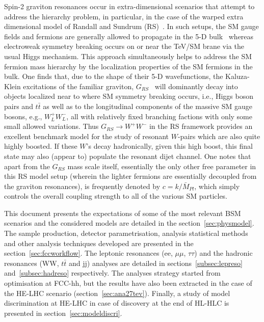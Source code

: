 \documentclass[a4paper,11pt]{article}
\begin{document}
Spin-2 graviton resonances occur in extra-dimensional scenarios that attempt to address the hierarchy problem, in particular, in the case of the warped extra dimensional model of
Randall and Sundrum (RS)~\cite{Randall:1999ee}. In such setups, the SM gauge fields and fermions are generally allowed to propagate in the 5-D
bulk~\cite{Pomarol:1999ad,Davoudiasl:1999tf,Grossman:1999ra,Davoudiasl:2000wi,Gherghetta:2000qt} whereas electroweak symmetry breaking occurs on or near the TeV/SM brane
via the usual Higgs mechanism. This approach simultaneously helps to address the SM fermion mass hierarchy by the localization properties of the SM fermions in the bulk.
One finds that, due to the shape of their 5-D wavefunctions, the Kaluza-Klein excitations of the familiar graviton, $G_{RS}$~\cite{Davoudiasl:1999jd} will dominantly decay into
objects localized near to where SM symmetry breaking occurs, i.e., Higgs boson pairs and $t\bar t$ as well as to the longitudinal components of the massive SM gauge bosons, e.g.,
$W^+_L W^-_L$, all with relatively fixed branching factions with only some small allowed variations. Thus $G_{RS}\rightarrow
W^+W^-$ in the RS framework provides an excellent benchmark model for the study of resonant $W$-pairs which are also quite highly boosted. If these $W$'s decay hadronically,
given this high boost, this final state may also (appear to) populate the resonant dijet channel. One notes that apart from the $G_{RS}$ mass scale itself, essentially the only other
free parameter in this RS model setup (wherein the lighter fermions are essentially decoupled from the graviton resonances), is frequently denoted by $c=k/\bar M_{Pl}$, which simply
controls the overall coupling strength to all of the various SM particles.

This document presents the expectations of some of the most relevant BSM scenarios and the considered models are detailed in the section~\ref{sec:physmodel}.
The sample production, detector parametrisation, analysis statistical methods and other analysis techniques developed are presented in the section~\ref{sec:fccworkflow}.
The leptonic resonances (ee, $\mu\mu$, $\tau\tau$) and the hadronic resonances (WW, $t\bar{t}$ and jj) analyses are detailed in sections~\ref{subsec:lepreso} and~\ref{subsec:hadreso} respectively.
The analyses strategy started from optimisation at FCC-hh, but the results have also been extracted in the case of the HE-LHC scenario (section~\ref{sec:ana27tev}).
Finally, a study of model discrimination at HE-LHC in case of discovery at the end of HL-HLC is presented in section~\ref{sec:modeldiscri}.
\end{document}
